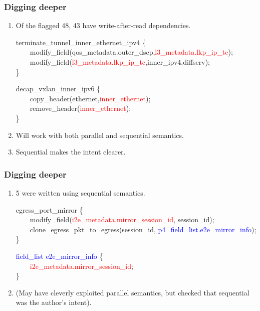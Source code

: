 \documentclass[aspectratio=169]{beamer}
\begin{document}
\begin{frame}[fragile]
  \frametitle{Digging deeper}
  \begin{enumerate}
    \item<1-> Of the flagged 48, 43 have write-after-read dependencies.
      \begin{texttt}
      terminate\_tunnel\_inner\_ethernet\_ipv4 \{ \\
        \ \ \ \ modify\_field(qos\_metadata.outer\_dscp,\textcolor{red}{l3\_metadata.lkp\_ip\_tc}); \\
        \ \ \ \ modify\_field(\textcolor{red}{l3\_metadata.lkp\_ip\_tc},inner\_ipv4.diffserv); \\
      \}
      \end{texttt}

      \begin{texttt}
      decap\_vxlan\_inner\_ipv6 \{ \\
        \ \ \ \  copy\_header(ethernet,\textcolor{red}{inner\_ethernet}); \\
        \ \ \ \  remove\_header(\textcolor{red}{inner\_ethernet}); \\
      \}
    \end{texttt}
    \item<2-> Will work with both parallel and sequential semantics.
    \item<3-> Sequential makes the intent clearer.
  \end{enumerate}
\end{frame}

\begin{frame}[fragile]
  \frametitle{Digging deeper}
  \begin{enumerate}
    \item<1-> 5 were written using sequential semantics.\\
      \begin{scriptsize}
      \begin{texttt}
        egress\_port\_mirror \{  \\
        \ \ \ \  modify\_field(\textcolor{red}{i2e\_metadata.mirror\_session\_id}, session\_id); \\
        \ \ \ \  clone\_egress\_pkt\_to\_egress(session\_id, \textcolor{blue}{p4\_field\_list.e2e\_mirror\_info}); \\
        \}

        \textcolor{blue}{field\_list e2e\_mirror\_info} \{ \\
          \ \ \ \ \textcolor{red}{i2e\_metadata.mirror\_session\_id}; \\
        \}
      \end{texttt}
      \end{scriptsize}
    \item<2-> (May have cleverly exploited parallel semantics,
               but checked that sequential was the author's intent).
  \end{enumerate}
\end{frame}
\end{document}
